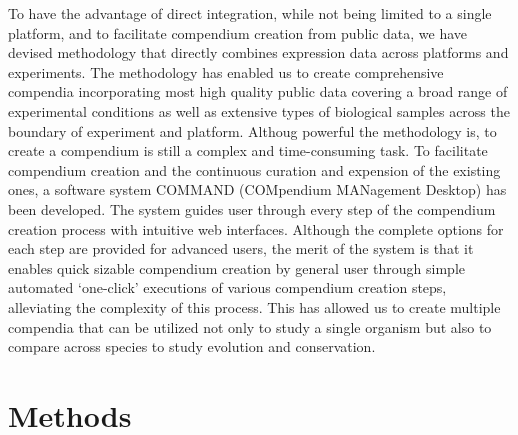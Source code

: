 To have the advantage of direct integration, while not being limited to a
single platform, and to facilitate compendium creation from public data, we
have devised methodology that directly combines expression data across
platforms and experiments.
%
The methodology has enabled us to create comprehensive compendia incorporating
most high quality public data covering a broad range of experimental conditions
as well as extensive types of biological samples across the boundary of
experiment and platform.
%
Althoug powerful the methodology is, to create a compendium is still a complex
and time-consuming task.
%
To facilitate compendium creation and the continuous curation and expension of
the existing ones, a software system COMMAND (COMpendium MANagement Desktop)
has been developed.
%
The system guides user through every step of the compendium creation process
with intuitive web interfaces.
%
Although the complete options for each step are provided for advanced users,
the merit of the system is that it enables quick sizable compendium creation by
general user through simple automated `one-click' executions of various
compendium creation steps, alleviating the complexity of this process.
%
This has allowed us to create multiple compendia that can be utilized not only
to study a single organism but also to compare across species to study
evolution and conservation.
%
%



\section{Methods}



